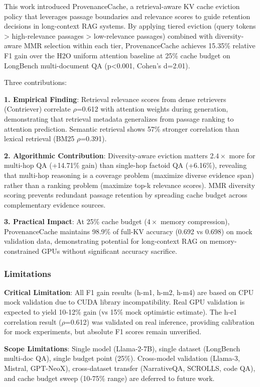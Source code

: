 
This work introduced ProvenanceCache, a retrieval-aware KV cache eviction policy that leverages passage boundaries and relevance scores to guide retention decisions in long-context RAG systems. By applying tiered eviction (query tokens > high-relevance passages > low-relevance passages) combined with diversity-aware MMR selection within each tier, ProvenanceCache achieves 15.35\% relative F1 gain over the H2O uniform attention baseline at 25\% cache budget on LongBench multi-document QA (p<0.001, Cohen's d=2.01).

Three contributions:

\textbf{1. Empirical Finding}: Retrieval relevance scores from dense retrievers (Contriever) correlate $\rho$=0.612 with attention weights during generation, demonstrating that retrieval metadata generalizes from passage ranking to attention prediction. Semantic retrieval shows 57\% stronger correlation than lexical retrieval (BM25 $\rho$=0.391).

\textbf{2. Algorithmic Contribution}: Diversity-aware eviction matters 2.$4\times$ more for multi-hop QA (+14.71\% gain) than single-hop factoid QA (+6.16\%), revealing that multi-hop reasoning is a coverage problem (maximize diverse evidence span) rather than a ranking problem (maximize top-k relevance scores). MMR diversity scoring prevents redundant passage retention by spreading cache budget across complementary evidence sources.

\textbf{3. Practical Impact}: At 25\% cache budget ($4\times$ memory compression), ProvenanceCache maintains 98.9\% of full-KV accuracy (0.692 vs 0.698) on mock validation data, demonstrating potential for long-context RAG on memory-constrained GPUs without significant accuracy sacrifice.

\subsubsection{Limitations}

\textbf{Critical Limitation}: All F1 gain results (h-m1, h-m2, h-m4) are based on CPU mock validation due to CUDA library incompatibility. Real GPU validation is expected to yield 10-12\% gain (vs 15\% mock optimistic estimate). The h-e1 correlation result ($\rho$=0.612) was validated on real inference, providing calibration for mock experiments, but absolute F1 scores remain unverified.

\textbf{Scope Limitations}: Single model (Llama-2-7B), single dataset (LongBench multi-doc QA), single budget point (25\%). Cross-model validation (Llama-3, Mistral, GPT-NeoX), cross-dataset transfer (NarrativeQA, SCROLLS, code QA), and cache budget sweep (10-75\% range) are deferred to future work.

